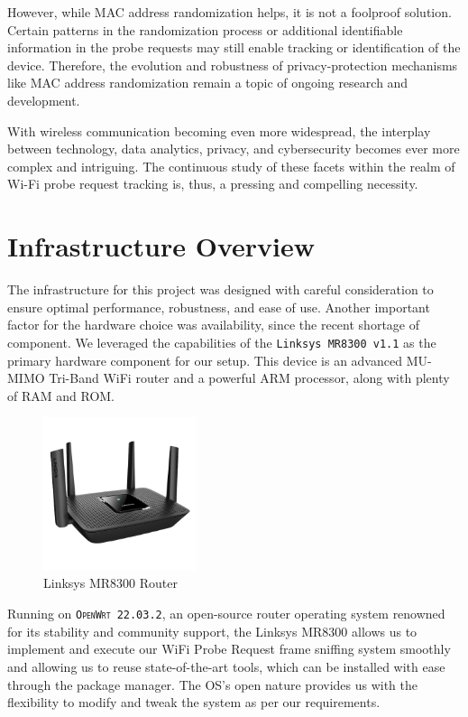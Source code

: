 \documentclass{article}
\begin{document}
However, while MAC address randomization helps, it is not a foolproof solution. Certain patterns in the randomization process or additional identifiable information in the probe requests may still enable tracking or identification of the device. Therefore, the evolution and robustness of privacy-protection mechanisms like MAC address randomization remain a topic of ongoing research and development. 

With wireless communication becoming even more widespread, the interplay between technology, data analytics, privacy, and cybersecurity becomes ever more complex and intriguing. The continuous study of these facets within the realm of Wi-Fi probe request tracking is, thus, a pressing and compelling necessity.


\section{Infrastructure Overview}

The infrastructure for this project was designed with careful consideration to ensure optimal performance, robustness, and ease of use. Another important factor for the hardware choice was availability, since the recent shortage of component. We leveraged the capabilities of the \texttt{Linksys MR8300 v1.1} as the primary hardware component for our setup. This device is an advanced MU-MIMO Tri-Band WiFi router and a powerful ARM processor, along with plenty of RAM and ROM.

\begin{figure}[h]
    \centering
    \includegraphics[width=0.4\textwidth]{assets/linksys_mr800.png}
    \caption{Linksys MR8300 Router}
    \label{fig:router}
\end{figure}

Running on \texttt{\textsc{OpenWrt} 22.03.2}, an open-source router operating system renowned for its stability and community support, the Linksys MR8300 allows us to implement and execute our WiFi Probe Request frame sniffing system smoothly and allowing us to reuse state-of-the-art tools, which can be installed with ease through the package manager. The OS's open nature provides us with the flexibility to modify and tweak the system as per our requirements.
\end{document}
